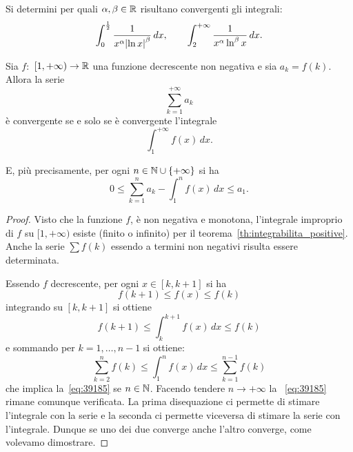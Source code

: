 \begin{exercise}
Si determini per quali $\alpha,\beta\in \mathbb R$ risultano convergenti
gli integrali:
\[
  \int_0^{\frac 1 2} \frac{1}{x^\alpha {\left|\ln x\right|}^\beta}\, dx,
  \qquad
  \int_2^{+\infty} \frac{1}{x^\alpha \ln^\beta x} \, dx.
\]
\end{exercise}

\begin{theorem}
\mymark{**}
Sia $f\colon$ $[1,+\infty)\to \mathbb R$ una funzione decrescente non negativa
e sia $a_k=f(k)$.
Allora la serie
\[
   \sum_{k=1}^{+\infty} a_k
\]
è convergente se e solo se è convergente l'integrale
\[
  \int_1^{+\infty} f(x)\, dx.
\]

E, più precisamente, per ogni $n\in \mathbb N\cup{\left\{ +\infty \right\}}$ si ha
\begin{equation}\label{eq:39185}
  0
  \le \sum_{k=1}^{n} a_k - \int_1^{n}f(x)\, dx
  \le a_1.
\end{equation}

\end{theorem}
%
\begin{proof}
\mymark{**}
Visto che la funzione $f$, è non negativa e monotona,
l'integrale improprio di $f$ su $[1,+\infty)$ esiste (finito o infinito)
per il teorema~\ref{th:integrabilita_positive}.
Anche la serie $\sum f(k)$ essendo a termini non negativi risulta essere determinata.

Essendo $f$ decrescente, per ogni $x \in [k,k+1]$ si ha
\[
  f(k+1) \le f(x) \le f(k)
\]
integrando su $[k,k+1]$ si ottiene
\[
  f(k+1) \le \int_{k}^{k+1} f(x)\, dx \le f(k)
\]
e sommando per $k=1,\dots, n-1$ si ottiene:
\[
  \sum_{k=2}^{n} f(k) \le \int_{1}^{n} f(x)\, dx \le \sum_{k=1}^{n-1} f(k)
\]
che implica la~\eqref{eq:39185} se $n\in \mathbb N$. Facendo
tendere $n\to+\infty$ la ~\eqref{eq:39185} rimane comunque verificata.
La prima disequazione ci permette di stimare l'integrale con la serie
e la seconda ci permette viceversa di stimare la serie con l'integrale.
Dunque se uno dei due converge anche l'altro converge, come volevamo dimostrare.
\end{proof}

